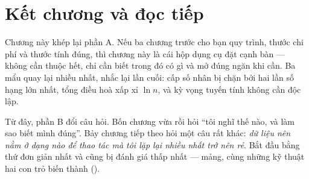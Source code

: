\documentclass[../../algorithm.tex]{subfiles}
\begin{document}
\section*{Kết chương và đọc tiếp}

Chương này khép lại phần A. Nếu ba chương trước cho bạn quy trình, thước chi phí và thước tính đúng, thì chương này là cái hộp dụng cụ đặt cạnh bàn --- không cần thuộc hết, chỉ cần biết trong đó có gì và mở đúng ngăn khi cần. Ba mẩu quay lại nhiều nhất, nhắc lại lần cuối: cấp số nhân bị chặn bởi hai lần số hạng lớn nhất, tổng điều hoà xấp xỉ \(\ln n\), và kỳ vọng tuyến tính không cần độc lập.

Từ đây, phần B đổi câu hỏi. Bốn chương vừa rồi hỏi ``tôi nghĩ thế nào, và làm sao biết mình đúng''. Bảy chương tiếp theo hỏi một câu rất khác: \emph{dữ liệu nên nằm ở dạng nào để thao tác mà tôi lặp lại nhiều nhất trở nên rẻ}. Bắt đầu bằng thứ đơn giản nhất và cũng bị đánh giá thấp nhất --- mảng, cùng những kỹ thuật hai con trỏ biến  thành  ().
\ifSubfilesClassLoaded{\printbibliography[title={Nguồn}]}{}
\end{document}
